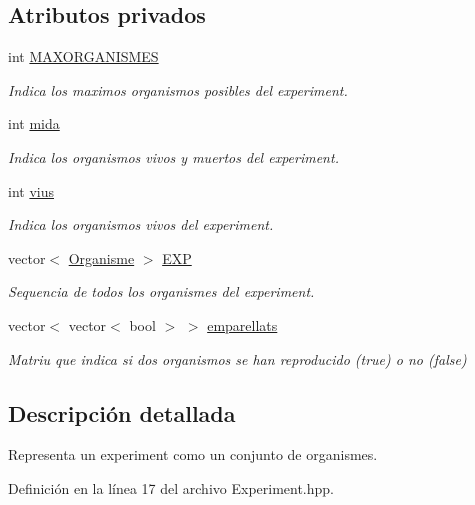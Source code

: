 \subsection*{Atributos privados}
\begin{DoxyCompactItemize}
\item 
int \hyperlink{class_experiment_a329359965b798fa1023b1b29d6ccf832}{M\-A\-X\-O\-R\-G\-A\-N\-I\-S\-M\-E\-S}
\begin{DoxyCompactList}\small\item\em Indica los maximos organismos posibles del experiment. \end{DoxyCompactList}\item 
int \hyperlink{class_experiment_aec56e0b0a0cda4d67ce25a0921d9ebf7}{mida}
\begin{DoxyCompactList}\small\item\em Indica los organismos vivos y muertos del experiment. \end{DoxyCompactList}\item 
int \hyperlink{class_experiment_a6d9c9be557f9df1d3162494c2b305ba0}{vius}
\begin{DoxyCompactList}\small\item\em Indica los organismos vivos del experiment. \end{DoxyCompactList}\item 
vector$<$ \hyperlink{class_organisme}{Organisme} $>$ \hyperlink{class_experiment_a2d3539cb5f6996e83a7d687538411501}{E\-X\-P}
\begin{DoxyCompactList}\small\item\em Sequencia de todos los organismes del experiment. \end{DoxyCompactList}\item 
vector$<$ vector$<$ bool $>$ $>$ \hyperlink{class_experiment_a34a18593817af15f21bf185369081b5c}{emparellats}
\begin{DoxyCompactList}\small\item\em Matriu que indica si dos organismos se han reproducido (true) o no (false) \end{DoxyCompactList}\end{DoxyCompactItemize}


\subsection{Descripción detallada}
Representa un experiment como un conjunto de organismes. 

Definición en la línea 17 del archivo Experiment.\-hpp.



